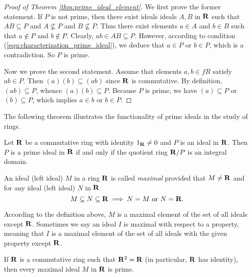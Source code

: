 \begin{proof}[Proof of Theorem \ref{thm:prime_ideal_element}]
We first prove the former statement. 
If $P$ is not prime, then there exist ideals ideals $A, B$ in $\mathbf{R}$ such 
that  $AB \subseteq P$ and $A \not \subseteq P$ and $B \not \subseteq P$. 
Thus there exist elements $a \in A $ and $b \in B$ such that $a \not \in 
P$ and $b \not \in P$. Clearly, $ab \in AB \subseteq P$. 
However, according to condition (\ref{equ:characterization_prime_ideal}), 
we deduce that $a \in P$ or $b \in P$, which is a contradiction. So $P$ is 
prime. 

Now we prove the second statement. Assume that elements $a, b \in fR$ 
satisfy $ab \in P$. Then $(a)(b) \subseteq (ab)$ since $\mathbf{R}$ is commutative. 
By definition, $(ab) \subseteq P$, whence $(a)(b) \subseteq P$. Because $P$ is 
prime, we have $(a) \subseteq P$ or $(b) \subseteq P$, which implies $a \in b$ 
or $b \in P$.
\end{proof}

The following theorem illustrates the functionality of prime ideals in 
the study of rings. 
\begin{thm}
\label{thm:functionality_prime_ideals}
Let $\mathbf{R}$ be a commutative ring with identity $1_{\mathbf{R}} \neq 0$ and $P$ is an 
ideal in $\mathbf{R}$. 
Then $P$ is a prime ideal in $\mathbf{R}$ if and only if the quotient ring $\mathbf{R} / 
P$ is an integral domain. 
\end{thm}

\begin{defn}
An ideal (\resp left ideal) $M$ in a ring $\mathbf{R}$ is called \emph{maximal} 
provided that $M \neq \mathbf{R}$ and for any ideal (\resp left ideal) $N$ in $\mathbf{R}$
\begin{equation}
    M \subseteq N \subseteq \mathbf{R} \implies N = M \text{ or } N = \mathbf{R}.
\end{equation}
\end{defn}

\begin{rmk}
According to the definition above, $M$ is a maximal element of the set of 
all ideals except $\mathbf{R}$. Sometimes we say an ideal $I$ is maximal with 
respect to a property, meaning that $I$ is a maximal element of the set of 
all ideals with the given property except $\mathbf{R}$. 
\end{rmk}

\begin{thm}
\label{thm:rings:ideals:prime_maximal_ideals:connection_prime_maximal_ideals}
If $\mathbf{R}$ is a commutative ring such that $\mathbf{R}^2 = \mathbf{R}$ (in particular, 
$\mathbf{R}$ has identity), then every maximal ideal $M$ in $\mathbf{R}$ is prime. 
\end{thm}

